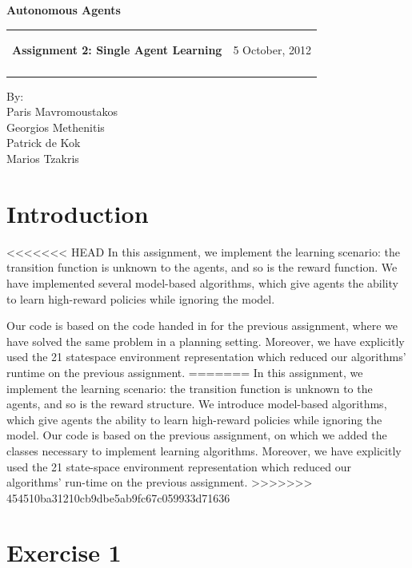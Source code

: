 \documentclass[a4paper,11pt]{article}
\makeatletter
\newcommand{\resheading}[1]{{\large \colorbox{mygrey}{\begin{minipage}{\textwidth}{\textbf{#1 \vphantom{p\^{E}}}}\end{minipage}}}}
\newcommand{\mywebheader}{
  \begin{tabular}{@{}p{5in}p{4in}}
  {\resheading{Assignment 2: Single Agent Learning}} & {\Large 5 October, 2012}\\\vspace{0.2cm}
  \end{tabular}}
\makeatother
\begin{document}
\begin{center}
{\LARGE \textbf{Autonomous Agents}}\\ [1em]
\end{center}
\mywebheader

\begin{center}
{\Large By:} \\ \vspace{0.1cm}
{\Large Paris Mavromoustakos} \\  \vspace{0.1cm}
{\Large Georgios Methenitis} \\ \vspace{0.1cm}
{\Large Patrick de Kok} \\ \vspace{0.1cm}
{\Large Marios Tzakris}
\end{center}




\section*{Introduction}

<<<<<<< HEAD
In this assignment, we implement the learning scenario: the transition function is unknown to the agents, and so is the reward function. We have implemented several model-based algorithms, which give agents the ability to learn high-reward %
policies while ignoring the model.  

Our code is based on the code handed in for the previous assignment, where we have solved the same problem in a planning setting.  Moreover, we have explicitly used the 21 statespace environment representation which reduced our algorithms' runtime on the previous assignment.
=======
In this assignment, we implement the learning scenario: the transition function is unknown to the agents, and so is the reward structure. We introduce model-based algorithms, which give agents the ability to learn high-reward policies while ignoring the model. Our code is based on the previous assignment, on which we added the classes necessary to implement learning algorithms. Moreover, we have explicitly used the 21 state-space environment representation which reduced our algorithms' run-time on the previous assignment.
>>>>>>> 454510ba31210cb9dbe5ab9fc67c059933d71636


\section*{Exercise 1}
\end{document}
